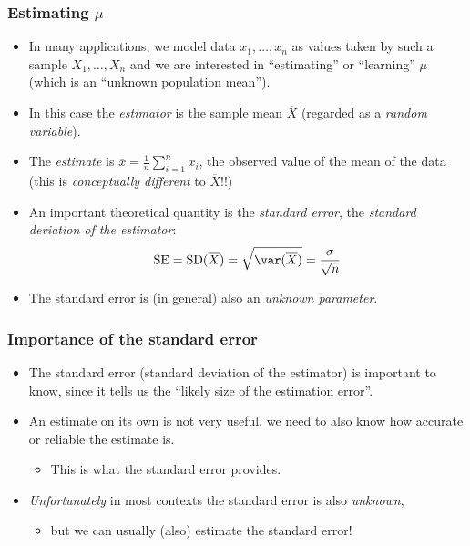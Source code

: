\documentclass[a4paper]{article}
\begin{document}
\subsubsection{Estimating \( \mu \)}
\begin{itemize}
	\item In many applications, we model data \( x_1,\dotsc,x_n \) as values taken by such a sample \( X_1,\dotsc,X_n \) and we are interested in ``estimating'' or ``learning'' \( \mu \) (which is an ``unknown population mean'').
	\item In this case the \textit{estimator} is the sample mean \( \overline{X} \) (regarded as a \textit{random variable}).
	\item The \textit{estimate} is \( \overline{x} = \frac{1}{n} \sum_{i=1}^{n} x_i \), the observed value of the mean of the data (this is \textit{conceptually different} to \( \overline{X} \)!!)
	\item An important theoretical quantity is the \textit{standard error}, the \textit{standard deviation of the estimator}:
	\[
		\mathrm{SE} = \mathrm{SD}(\overline{X}) = \sqrt{\var(\overline{X})} = \frac{\sigma}{\sqrt{n}}
	\]
	\item The standard error is (in general) also an \textit{unknown parameter}.
\end{itemize}
\subsubsection{Importance of the standard error}
\begin{itemize}
	\item The standard error (standard deviation of the estimator) is important to know, since it tells us the ``likely size of the estimation error''.
	\item An estimate on its own is not very useful, we need to also know how accurate or reliable the estimate is.
	\begin{itemize}
		\item This is what the standard error provides.
	\end{itemize}
	\item \textit{Unfortunately} in most contexts the standard error is also \textit{unknown},
	\begin{itemize}
		\item but we can usually (also) estimate the standard error!
	\end{itemize}
\end{itemize}
\end{document}
